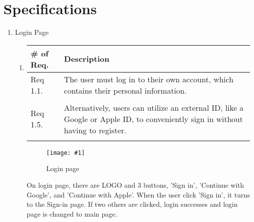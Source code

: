 \section{\Large{Specifications}}
\begin{enumerate}[label=\arabic*.]

    \newcommand{\requirementTable}[1]{
        \begin{table}[H]
            \center
            \begin{tabular}{m{1.4cm} m{5.5cm}}
                \toprule
                \# of Req. & Description \\
                \midrule
                #1
                \bottomrule
            \end{tabular}
        \end{table}
    }

    \newcommand{\addImage}[2]{
        \begin{figure}[ht]
            \begin{center}
                \texttt{[image: \#1]}
                \caption{#2} %
                \renewcommand{\thefigure}{\thesubsection.\arabic{figure}}
            \end{center}
        \end{figure}
    }


    \item {\large{Login Page}}
          \begin{enumerate}[label*={\arabic*.},ref=\theenumi.\arabic*]
              \setlength{\itemindent}{0.5cm}
              \item
                    \requirementTable{
                        Req 1.1. & The user must log in to their own account, which contains their personal information.\\\\
                        Req 1.5. & Alternatively, users can utilize an external ID, like a Google or Apple ID, to conveniently sign in without having to register.\\\\
                    }
                    \addImage{
                        imgs/specification/login.png
                    }{
                        Login page
                    }
                    On login page, there are LOGO and 3 buttons, 'Sign in', 'Continue with Google', and 'Continue with Apple'. When the user click 'Sign in', it turns to the Sign-in page. If two others are clicked, login successes and login page is changed to main page.\\\\


\end{enumerate}
\end{enumerate}
